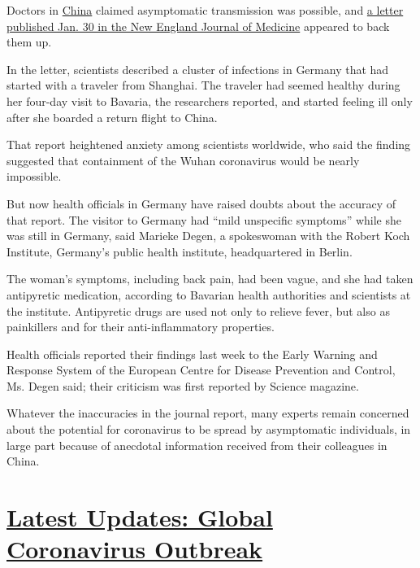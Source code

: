 Doctors in
\href{https://www.nytimes.com/2020/02/20/world/asia/japan-coronavirus-clusters.html}{China}
claimed asymptomatic transmission was possible, and
\href{https://www.nejm.org/doi/full/10.1056/NEJMc2001468}{a letter
published Jan. 30 in the New England Journal of Medicine} appeared to
back them up.

In the letter, scientists described a cluster of infections in Germany
that had started with a traveler from Shanghai. The traveler had seemed
healthy during her four-day visit to Bavaria, the researchers reported,
and started feeling ill only after she boarded a return flight to China.

That report heightened anxiety among scientists worldwide, who said the
finding suggested that containment of the Wuhan coronavirus would be
nearly impossible.

But now health officials in Germany have raised doubts about the
accuracy of that report. The visitor to Germany had ``mild unspecific
symptoms'' while she was still in Germany, said Marieke Degen, a
spokeswoman with the Robert Koch Institute, Germany's public health
institute, headquartered in Berlin.

The woman's symptoms, including back pain, had been vague, and she had
taken antipyretic medication, according to Bavarian health authorities
and scientists at the institute. Antipyretic drugs are used not only to
relieve fever, but also as painkillers and for their anti-inflammatory
properties.

Health officials reported their findings last week to the Early Warning
and Response System of the European Centre for Disease Prevention and
Control, Ms. Degen said; their criticism was first reported by Science
magazine.

Whatever the inaccuracies in the journal report, many experts remain
concerned about the potential for coronavirus to be spread by
asymptomatic individuals, in large part because of anecdotal information
received from their colleagues in China.

\hypertarget{latest-updates-global-coronavirus-outbreak}{%
\section{\texorpdfstring{\href{https://www.nytimes.com/2020/08/01/world/coronavirus-covid-19.html?action=click\&pgtype=Article\&state=default\&region=MAIN_CONTENT_1\&context=storylines_live_updates}{Latest
Updates: Global Coronavirus
Outbreak}}{Latest Updates: Global Coronavirus Outbreak}}\label{latest-updates-global-coronavirus-outbreak}}

